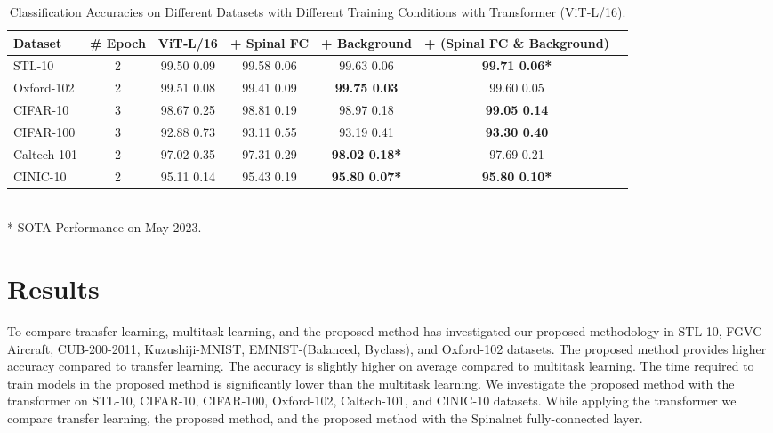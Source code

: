 \documentclass{article}
\begin{document}
\begin{table*}[t]
\caption{Classification Accuracies on Different Datasets with Different Training Conditions with Transformer (ViT‑L/16).}
\label{TTransformer}
\vskip 0.15in
\begin{center}
\begin{small}
\begin{sc}
\begin{tabular}{lcccccr}
\toprule
Dataset & \# Epoch & ViT‑L/16 & + Spinal FC & + Background & + (Spinal FC \& Background) \\
\midrule  
STL-10  &2 &99.50 0.09& 99.58 0.06& 99.63 0.06 & \bf{99.71 0.06}* \\
Oxford-102  &2 &99.51 0.08& 99.41 0.09& \bf{99.75 0.03} & 99.60 0.05 \\
CIFAR-10  &3 &98.67 0.25& 98.81 0.19& 98.97 0.18 & \bf{99.05 0.14} \\
CIFAR-100  &3 &92.88 0.73& 93.11 0.55& 93.19 0.41& \bf{93.30 0.40} \\
Caltech-101  &2 &97.02 0.35& 97.31 0.29& \bf{98.02 0.18}*& 97.69 0.21 \\
CINIC-10  &2 &95.11 0.14& 95.43 0.19& \bf{95.80 0.07}* & \bf{95.80 0.10}* \\


\bottomrule
\end{tabular}
\\ * SOTA Performance on May 2023.
\end{sc}
\end{small}
\end{center}
\vskip -0.1in
\end{table*}


\section{Results}
To compare transfer learning, multitask learning, and the proposed method has investigated our proposed methodology in STL-10, FGVC Aircraft, CUB-200-2011, Kuzushiji-MNIST, EMNIST-(Balanced, Byclass), and Oxford-102 datasets. The proposed method provides higher accuracy compared to transfer learning. The accuracy is slightly higher on average compared to multitask learning. The time required to train models in the proposed method is significantly lower than the multitask learning. We investigate the proposed method with the transformer on STL-10, CIFAR-10, CIFAR-100, Oxford-102, Caltech-101, and CINIC-10 datasets. While applying the transformer we compare transfer learning, the proposed method, and the proposed method with the Spinalnet fully-connected layer.
\end{document}
